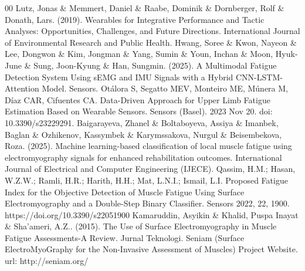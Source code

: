 \documentclass[conference]{IEEEtran}
\begin{document}
\begin{thebibliography}{00}
 Lutz, Jonas \& Memmert, Daniel \& Raabe, Dominik \& Dornberger, Rolf \& Donath, Lars. (2019). Wearables for Integrative Performance and Tactic Analyses: Opportunities, Challenges, and Future Directions. International Journal of Environmental Research and Public Health. 
 Hwang, Soree \& Kwon, Nayeon \& Lee, Dongwon \& Kim, Jongman \& Yang, Sumin \& Youn, Inchan \& Moon, Hyuk-June \& Sung, Joon-Kyung \& Han, Sungmin. (2025). A Multimodal Fatigue Detection System Using sEMG and IMU Signals with a Hybrid CNN-LSTM-Attention Model. Sensors.  
 Otálora S, Segatto MEV, Monteiro ME, Múnera M, Díaz CAR, Cifuentes CA. Data-Driven Approach for Upper Limb Fatigue Estimation Based on Wearable Sensors. Sensors (Basel). 2023 Nov 20. doi: 10.3390/s23229291.
 Baigarayeva, Zhanel \& Boltaboyeva, Assiya \& Imanbek, Baglan \& Ozhikenov, Kassymbek \& Karymssakova, Nurgul \& Beisembekova, Roza. (2025). Machine learning-based classification of local muscle fatigue using electromyography signals for enhanced rehabilitation outcomes. International Journal of Electrical and Computer Engineering (IJECE). 
 Qassim, H.M.; Hasan, W.Z.W.; Ramli, H.R.; Harith, H.H.; Mat, L.N.I.; Ismail, L.I. Proposed Fatigue Index for the Objective Detection of Muscle Fatigue Using Surface Electromyography and a Double-Step Binary Classifier. Sensors 2022, 22, 1900. https://doi.org/10.3390/s22051900 
 Kamaruddin, Asyikin \& Khalid, Puspa Inayat \& Sha'ameri, A.Z.. (2015). The Use of Surface Electromyography in Muscle Fatigue Assessments-A Review. Jurnal Teknologi.  
 Seniam (Surface ElectroMyoGraphy for the Non-Invasive Assessment of Muscles) Project Website. url: http://seniam.org/
\end{thebibliography}

\end{document}
